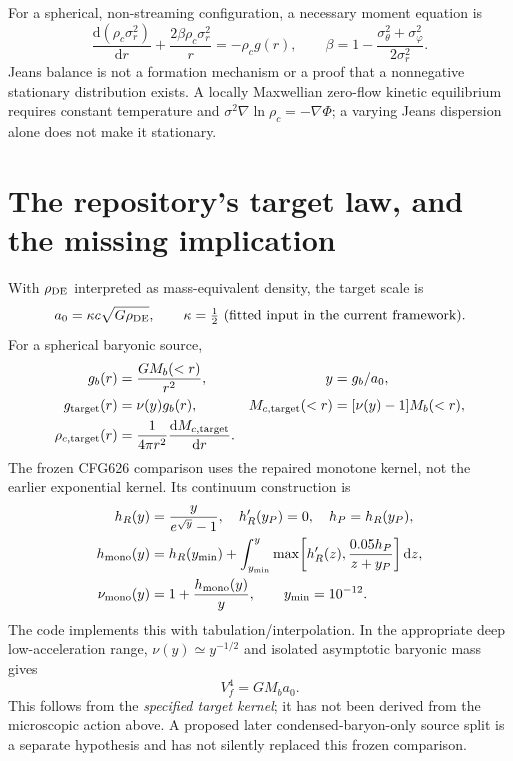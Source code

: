 \documentclass[11pt]{article}
\newcommand{\dd}{\mathrm{d}}
\begin{document}
For a spherical, non-streaming configuration, a necessary moment equation is
\begin{equation}
 \frac{\dd(\rho_c\sigma_r^2)}{\dd r}+\frac{2\beta\rho_c\sigma_r^2}{r}=-\rho_c g(r),\qquad
 \beta=1-\frac{\sigma_\theta^2+\sigma_\varphi^2}{2\sigma_r^2}.
\end{equation}
Jeans balance is not a formation mechanism or a proof that a nonnegative stationary distribution exists. A locally Maxwellian zero-flow kinetic equilibrium requires constant temperature and $\sigma^2\nabla\ln\rho_c=-\nabla\Phi$; a varying Jeans dispersion alone does not make it stationary.

\section{The repository's target law, and the missing implication}
With $\rho_{\rm DE}$ interpreted as mass-equivalent density, the target scale is
\begin{equation}
 a_0=\kappa c\sqrt{G\rho_{\rm DE}},\qquad \kappa=\tfrac12\ \text{(fitted input in the current framework)}.
\end{equation}
For a spherical baryonic source,
\begin{align}
 g_b(r)&=\frac{GM_b(<r)}{r^2},&y&=g_b/a_0,\\
 g_{\rm target}(r)&=\nu(y)g_b(r),&
 M_{c,\rm target}(<r)&=[\nu(y)-1]M_b(<r),\\
 \rho_{c,\rm target}(r)&=\frac{1}{4\pi r^2}\frac{\dd M_{c,\rm target}}{\dd r}.
\end{align}
The frozen CFG626 comparison uses the repaired monotone kernel, not the earlier exponential kernel. Its continuum construction is
\begin{align}
 h_R(y)&=\frac{y}{e^{\sqrt y}-1},\quad h_R'(y_P)=0,\quad h_P=h_R(y_P),\\
 h_{\rm mono}(y)&=h_R(y_{\min})+
 \int_{y_{\min}}^y\max\!\left[h_R'(z),\frac{0.05h_P}{z+y_P}\right]\dd z,\\
 \nu_{\rm mono}(y)&=1+\frac{h_{\rm mono}(y)}{y},\qquad y_{\min}=10^{-12}.
\end{align}
The code implements this with tabulation/interpolation. In the appropriate deep low-acceleration range, $\nu(y)\simeq y^{-1/2}$ and isolated asymptotic baryonic mass gives
\begin{equation}
 \boxed{V_f^4=GM_ba_0.}
\end{equation}
This follows from the \emph{specified target kernel}; it has not been derived from the microscopic action above. A proposed later condensed-baryon-only source split is a separate hypothesis and has not silently replaced this frozen comparison.
\end{document}
